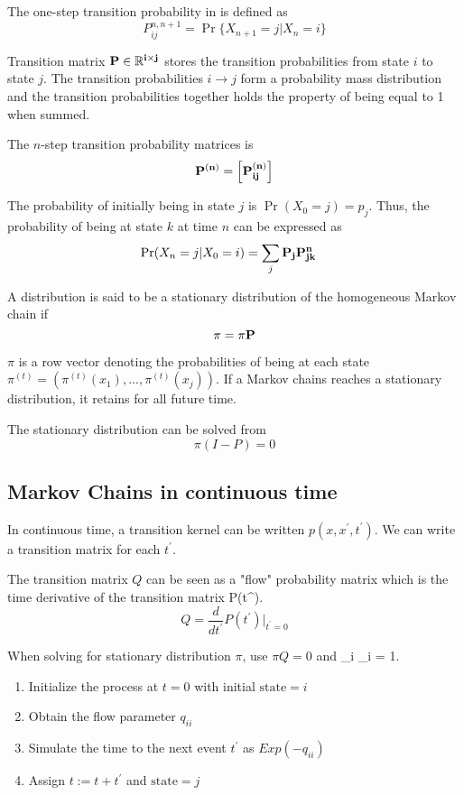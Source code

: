 \documentclass[letterpaper, 12pt]{article}
\newcommand{\myexample}[2]{
    \begin{tcolorbox}[colback=black!5!white,colframe=black,title={Example: #1},
    before skip=12pt]
        #2
    \end{tcolorbox}
}
\newcommand{\R}{\mathbb{R}} %
\newcommand{\1}{\mathds{1}} %
\theoremstyle{definition}
\begin{document}
The one-step transition probability in is defined as
\[
  P_{ij}^{n, n+1} = \Pr\{X_{n+1} = j | X_n = i\}
\]

Transition matrix $ \bf P \in \R^{i \times j}$ stores the transition probabilities from state $i$ to state $j$. The transition probabilities $i \rightarrow j$ form a probability mass distribution and the transition probabilities together holds the property of being equal to 1 when summed.

The $n$-step transition probability matrices is
\[
  \bf P^{(n)} = \left[ P_{ij}^{(n)} \right]
\]

The probability of initially being in state $j$ is $\Pr(X_0 = j)=p_j$. Thus, the probability of being at state $k$ at time $n$ can be expressed as
\[
  \Pr(X_n = j | X_0 = i) = \sum_{j} \bf{P}_j \bf{P}_{jk}^{n} \quad
\]

A distribution is said to be a stationary distribution of the homogeneous Markov chain if
\[\pi = \pi\bf{P}\]

$\pi$ is a row vector denoting the probabilities of being at each state $\pi^{(t)} = \left( \pi^{(t)}(x_1), ..., \pi^{(t)}(x_j) \right)$. If a Markov chains reaches a stationary distribution, it retains for all future time.

The stationary distribution can be solved from
\[
  \pi(I-P) = 0
\]

\subsection{Markov Chains in continuous time}

In continuous time, a transition kernel can be written $p(x, x^\prime, t^\prime)$. We can write a transition matrix for each $t^\prime$.

The transition matrix $Q$ can be seen as a "flow" probability matrix which is the time derivative of the transition matrix P(t^\prime).
\[
  Q = \frac{d}{dt^\prime} P(t^\prime)\vert_{t^\prime=0}
\]

When solving for stationary distribution $\pi$, use $\pi Q = 0$ and \sum_i \pi_i = 1.

\myexample{Discrete event simulation}{
\begin{enumerate}[itemsep=-1pt]
  \item Initialize the process at $t=0$ with initial $\text{state} = i$
  \item Obtain the flow parameter $q_{ii}$
  \item Simulate the time to the next event $t^\prime$ as $Exp(-q_{ii})$
  \item Assign $t:= t + t^\prime$ and $\text{state} = j$
\end{enumerate}
}
\end{document}
